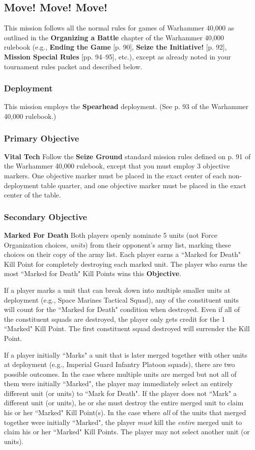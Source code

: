 \documentclass[12pt,titlepage]{article}
\newcommand{\paragraphsmall}[1]{\noindent\textbf{#1}\quad}
\newcommand{\gameboilerplate}{This mission follows all the normal rules for games of Warhammer 40,000 as outlined in the \textbf{Organizing a Battle} chapter of the Warhammer 40,000 rulebook (e.g., \textbf{Ending the Game} [p. 90], \textbf{Seize the Initiative!} [p. 92], \textbf{Mission Special Rules} [pp. 94--95], etc.), except as already noted in your tournament rules packet and described below.}
\newcommand{\spearhead}{This mission employs the \textbf{Spearhead} deployment. (See p. 93 of the Warhammer 40,000 rulebook.)}
\begin{document}
\subsection*{Move! Move! Move!}
{\footnotesize
\gameboilerplate

\vspace{-6pt}
\subsubsection*{Deployment}

\spearhead

\vspace{-6pt}
\subsubsection*{Primary Objective}

\paragraphsmall{Vital Tech} Follow the \textbf{Seize Ground} standard mission rules defined on p. 91 of the Warhammer 40,000 rulebook, except that you must employ 3 objective markers. One objective marker must be placed in the exact center of each non-deployment table quarter, and one objective marker must be placed in the exact center of the table.

\vspace{-6pt}
\subsubsection*{Secondary Objective}

\paragraphsmall{Marked For Death} Both players openly nominate 5 units (not Force Organization choices, \textit{units}) from their opponent's army list, marking these choices on their copy of the army list.  Each player earns a ``Marked for Death" Kill Point for completely destroying each marked unit. The player who earns the most ``Marked for Death" Kill Points wins this \textbf{Objective}.

If a player marks a unit that can break down into multiple smaller units at deployment (e.g., Space Marines Tactical Squad), any of the constituent units will count for the ``Marked for Death" condition when destroyed. Even if all of the constituent squads are destroyed, the player only gets credit for the 1 ``Marked" Kill Point. The first constituent squad destroyed will surrender the Kill Point.

If a player initially ``Marks" a unit that is later merged together with other units at deployment (e.g., Imperial Guard Infantry Platoon squads), there are two possible outcomes. In the case where multiple units are merged but not all of them were initially ``Marked", the player may immediately select an entirely different unit (or units) to ``Mark for Death". If the player does not ``Mark" a different unit (or units), he or she must destroy the entire merged unit to claim his or her ``Marked" Kill Point(s). In the case where \textit{all} of the units that merged together were initially ``Marked", the player \textit{must} kill the \textit{entire} merged unit to claim his or her ``Marked" Kill Points. The player may not select another unit (or units).

}
\end{document}
